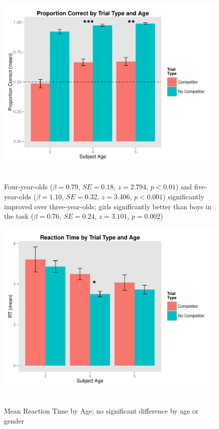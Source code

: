 \documentclass[12pt, oneside]{article}   	%
\begin{document}
\begin{figure}[h!]
  \centering
    \includegraphics[width=1.2\textwidth]{CLAV_Exp1_ProportionCorrect.pdf}\
    \caption{Four-year-olds ($\beta=0.79$, $SE=0.18$, $z=2.794$, $p < 0.01$) and five-year-olds ($\beta=1.10$, $SE=0.32$, $z=3.406$, $p < 0.001$) significantly improved over three-year-olds; girls significantly better than boys in the task ($\beta=0.76$, $SE=0.24$, $z=3.101$, $p = 0.002$)}
\end{figure}

\begin{figure}[h!]
  \centering
    \includegraphics[width=1.2\textwidth]{CLAV_Exp1_MeanRT.pdf}\
    \caption{Mean Reaction Time by Age; no significant difference by age or gender}
\end{figure}
\end{document}
